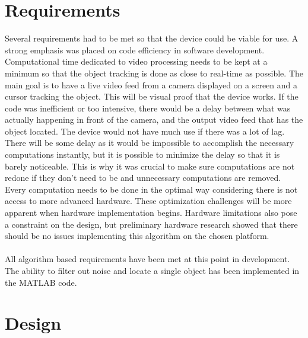 \documentclass[12pt]{article} %
\begin{document}
\section{Requirements}
Several requirements had to be met so that the device could be viable for use. A strong emphasis was placed on code efficiency in software development. Computational time dedicated to video processing needs to be kept at a minimum so that the object tracking is done as close to real-time as possible. The main goal is to have a live video feed from a camera displayed on a screen and a cursor tracking the object. This will be visual proof that the device works. If the code was inefficient or too intensive, there would be a delay between what was actually happening in front of the camera, and the output video feed that has the object located. The device would not have much use if there was a lot of lag. There will be some delay as it would be impossible to accomplish the necessary computations instantly, but it is possible to minimize the delay so that it is barely noticeable. This is why it was crucial to make sure computations are not redone if they don't need to be and unnecessary computations are removed. Every computation needs to be done in the optimal way considering there is not access to more advanced hardware. These optimization challenges will be more apparent when hardware implementation begins. Hardware limitations also pose a constraint on the design, but preliminary hardware research showed that there should be no issues implementing this algorithm on the chosen platform. \\\\
All algorithm based requirements have been met at this point in development. The ability to filter out noise and locate a single object has been implemented in the MATLAB code. 
\section{Design}
\end{document}

